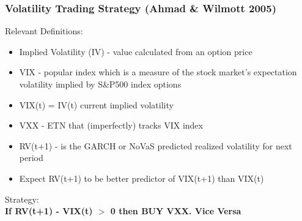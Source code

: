 \documentclass{beamer}
\begin{document}
\begin{frame}
\frametitle{Volatility Trading Strategy (Ahmad \& Wilmott 2005)}
\vspace{-2pt}
Relevant Definitions:
\begin{itemize}
\item{Implied Volatility (IV) - value calculated from an option price}
\vspace{2pt}
\item{VIX - popular index which is a measure of the stock market's expectation volatility implied by S\&P500 index options}
\vspace{2pt}
\item{VIX(t) = IV(t) current implied volatility}
\vspace{2pt}
\item{VXX - ETN that (imperfectly) tracks VIX index}
\vspace{2pt}
\item{RV(t+1) - is the GARCH or NoVaS predicted realized volatility for next period}
\vspace{2pt}
\item{Expect RV(t+1) to be better predictor of VIX(t+1) than VIX(t)}
\end{itemize}
\vspace{2pt}
Strategy:\\
\vspace{2pt}
\hspace{10pt}\textbf{If RV(t+1) - VIX(t) $>$ 0 then BUY VXX. Vice Versa}
\end{frame}
\end{document}
